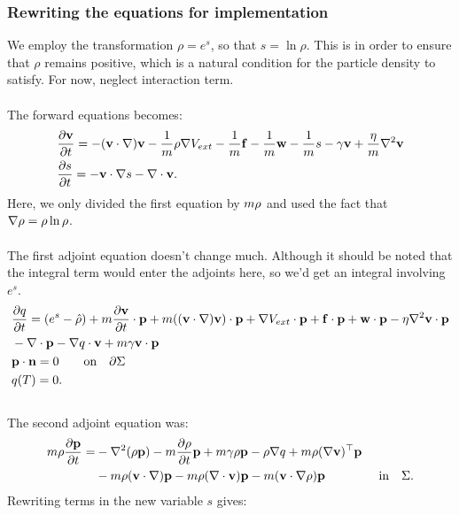 \subsubsection*{Rewriting the equations for implementation}
We employ the transformation $\rho = e^s$, so that $s = \ln \rho$. This is in order to ensure that $\rho$ remains positive, which is a natural condition for the particle density to satisfy. For now, neglect interaction term.
\\
\\
The forward equations becomes:
\begin{align*}
& \frac{\partial \mathbf{v}}{\partial t}= -  (\mathbf{v} \cdot \nabla)\mathbf{v} - \frac{1}{m}\rho \nabla V_{ext} -\frac{1}{m}\mathbf{f} -\frac{1}{m} \mathbf{w} - \frac{1}{m} s - \gamma \mathbf{v} +  \frac{\eta}{m} \nabla^2 \mathbf{v}\\
 &\frac{\partial s}{\partial t} = - \mathbf{v} \cdot \nabla s - \nabla \cdot \mathbf{v} .
\end{align*}
Here, we only divided the first equation by $m \rho$ and used the fact that $\nabla \rho = \rho \ln \rho$.\\
\\
The first adjoint equation doesn't change much. Although it should be noted that the integral term would enter the adjoints here, so we'd get an integral involving $e^s$.
\begin{align*}
& \frac{\partial q}{\partial t} = (e^s - \hat \rho) +m  \frac{\partial \mathbf{v}}{\partial t}\cdot \mathbf{p} + m ( (\mathbf{v} \cdot \nabla)\mathbf{v}) \cdot \mathbf{p}+ \nabla V_{ext}\cdot \mathbf{p} + \mathbf{f} \cdot \mathbf{p} + \mathbf{w} \cdot \mathbf{p}  - \eta \nabla^2 \mathbf{v} \cdot \mathbf{p} \\
&-\nabla\cdot \mathbf{p}  -  \nabla q \cdot \mathbf{v} + m \gamma \mathbf{v} \cdot \mathbf{p}  \qquad \\
& \mathbf{p} \cdot \mathbf{n} = 0 \qquad \text{on} \quad \partial \Sigma\\
&q(T) = {0} .
\end{align*}
\\
The second adjoint equation was:
\begin{align*}
m\rho \frac{\partial \mathbf{p}}{\partial t} =& -\nabla^2 (\rho \mathbf{p}) - m \frac{\partial \rho}{\partial t} \mathbf{p}   +m \gamma \rho \mathbf{p}-\rho\nabla q +m \rho (\nabla \mathbf{v})^\top\mathbf{p} \\
&-m \rho (\mathbf{v} \cdot \nabla)\mathbf{p} - m \rho (\nabla \cdot \mathbf{v})\mathbf{p}  - m (\mathbf{v} \cdot \nabla \rho)\mathbf{p}  \ \qquad\qquad \text{in} \quad \Sigma.
\end{align*}
Rewriting terms in the new variable $s$ gives:

